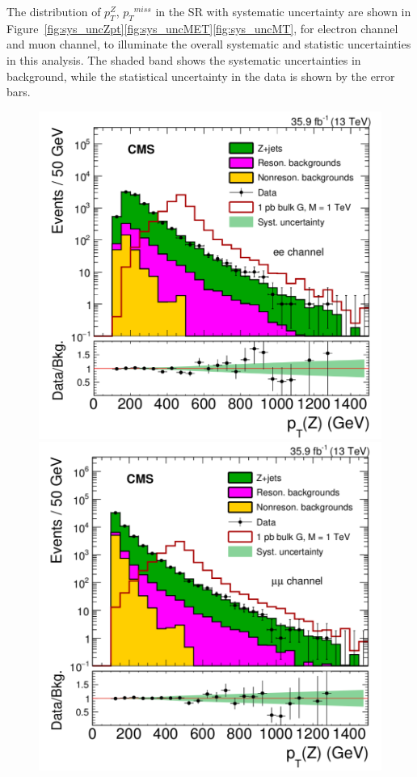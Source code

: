 \vspace{0.3cm}
The distribution of $p_T ^Z$, ${p_{T}}^{miss}$ in the SR with systematic uncertainty are shown in Figure~\ref{fig:sys_uncZpt}\ref{fig:sys_uncMET}\ref{fig:sys_uncMT}, for electron channel and muon channel, to illuminate the overall systematic and statistic uncertainties in this analysis. The shaded band shows the systematic uncertainties in background, while the statistical uncertainty in the data is shown by the error bars.
\begin{figure}[htbp]
\begin{center}
\includegraphics[width=0.9\linewidth]{figures/sys_elSRuncZpt.png}
\includegraphics[width=0.9\linewidth]{figures/sys_muSRuncZpt.png}

\end{center}
\end{figure}

